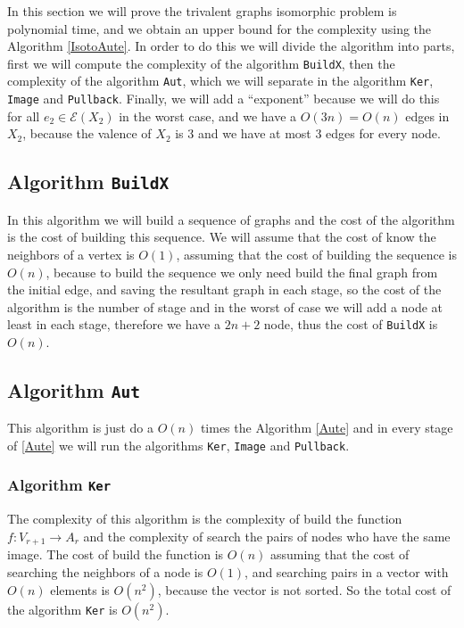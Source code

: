 \documentclass[12pt,a4paper]{book}
\theoremstyle{plain}
\theoremstyle{definition}
\theoremstyle{remark}
\begin{document}
In this section we will prove the trivalent graphs  isomorphic problem is  polynomial time,  and we obtain an upper bound 
for the complexity using the Algorithm \ref{IsotoAute}. In order to do this we will divide the algorithm into parts, first we will 
compute the complexity of the algorithm \texttt{BuildX}, then  the complexity of the algorithm \texttt{Aut}, which we will separate 
in the algorithm \texttt{Ker},  \texttt{Image} and \texttt{Pullback}. Finally,  we will add a ``exponent'' because we will do this 
for all $e_2 \in \mathcal{E}(X_2)$ in the worst case, and we have a $O(3n)=O(n)$ edges in $X_2$, because the valence of $X_2$ is 3 
and we have at most 3 edges for every node.

\subsection{Algorithm \texttt{BuildX}}

In this algorithm we will build a sequence of graphs and the cost of the algorithm is the cost of building this sequence. We will 
assume that the cost of know the neighbors of a vertex is $O(1)$, assuming that the cost of building the sequence is $O(n)$, because 
to build the sequence we only need build the final graph from the initial edge, and saving the resultant graph in each stage, so the 
cost of the algorithm is the number of stage and in the worst of case we will add a node at least in each stage, therefore we have a 
$2n+2$ node, thus the cost of \texttt{BuildX} is $O(n)$.

\subsection{Algorithm \texttt{Aut}}
This algorithm is just do a $O(n)$ times the Algorithm \ref{Aute} and in every stage of \ref{Aute} we will run the algorithms 
\texttt{Ker}, \texttt{Image} and \texttt{Pullback}.

\subsubsection{Algorithm \texttt{Ker}}
The complexity of this algorithm is the complexity of build the function $f: V_{r+1} \rightarrow A_r$ and the complexity of search 
the pairs of nodes who have the same image. The cost of build the function is $O(n)$ assuming that the cost of searching the neighbors
 of a node is $O(1)$, and searching pairs in a vector with $O(n)$ elements is $O(n^2)$, because the vector is not sorted. So 
 the total cost of the algorithm \texttt{Ker} is $O(n^2)$.
\end{document}
